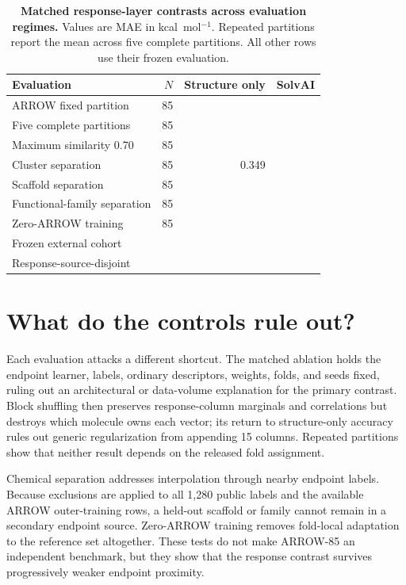\documentclass{article}
\begin{document}
\begin{table}[t]
\centering
\caption{\textbf{Matched response-layer contrasts across evaluation regimes.}
Values are MAE in kcal~mol$^{-1}$. Repeated partitions report the mean across five
complete partitions. All other rows use their frozen evaluation.}
\label{tab:summary}
\small
\begin{tabular}{lrrr}
\toprule
Evaluation & $N$ & Structure only & SolvAI \\
\midrule
ARROW fixed partition & 85 & \MatchedMAE{} & \SolvAIMAE{} \\
Five complete partitions & 85 & \MatchedRepeatMean{} & \RepeatMean{} \\
Maximum similarity 0.70 & 85 & \NNSeventyMatchedMAE{} & \NNSeventySolvAIMAE{} \\
Cluster separation & 85 & 0.349 & \ClusterMAE{} \\
Scaffold separation & 85 & \ScaffoldMatchedMAE{} & \ScaffoldMAE{} \\
Functional-family separation & 85 & \FamilyMatchedMAE{} & \FamilyMAE{} \\
Zero-ARROW training & 85 & \ZeroArrowMatchedMAE{} & \ZeroArrowMAE{} \\
Frozen external cohort & \TierAN{} & \TierAStructureMAE{} & \TierASolvAIMAE{} \\
Response-source-disjoint & \TierAStrictN{} & \TierAStrictStructureMAE{} & \TierAStrictSolvAIMAE{} \\
\bottomrule
\end{tabular}
\end{table}

\section{What do the controls rule out?}

Each evaluation attacks a different shortcut. The matched ablation holds the endpoint
learner, labels, ordinary descriptors, weights, folds, and seeds fixed, ruling out an
architectural or data-volume explanation for the primary contrast. Block shuffling
then preserves response-column marginals and correlations but destroys which molecule
owns each vector; its return to structure-only accuracy rules out generic regularization
from appending 15 columns. Repeated partitions show that neither result depends on the
released fold assignment.

Chemical separation addresses interpolation through nearby endpoint labels. Because
exclusions are applied to all 1,280 public labels and the available ARROW outer-training
rows, a held-out scaffold or family cannot remain in a secondary endpoint source.
Zero-ARROW training removes fold-local adaptation to the reference set altogether.
These tests do not make ARROW-85 an independent benchmark, but they show that the
response contrast survives progressively weaker endpoint proximity.
\end{document}
